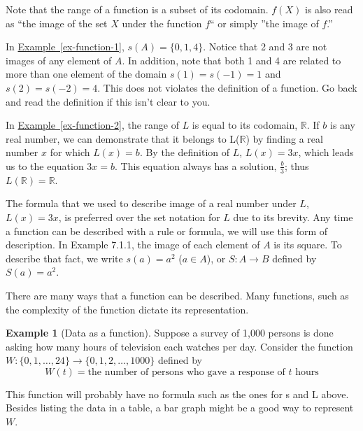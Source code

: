 \documentclass[10pt,]{book}
\theoremstyle{plain}
\theoremstyle{definition}
\theoremstyle{definition}
\newtheorem{example}[theorem]{Example}
\theoremstyle{definition}
\begin{document}
\par
Note that the range of a function is a subset of its codomain. \(f(X)\) is also read as ``the image of the set \(X\) under the function \(f\)`` or simply ''the image of \(f\).''%
\par
In \hyperref[ex-function-1]{Example~\ref{ex-function-1}}, \(s(A)= \{0, 1, 4\}\). Notice that 2 and 3 are not images of any element of \(A\). In addition, note that both 1 and 4 are related to more than one element of the domain \(s(1) = s(-1) = 1\) and \(s(2) = s(-2) = 4\). This does not violates the definition of a function. Go back and read the definition if this isn't clear to you.%
\par
In \hyperref[ex-function-2]{Example~\ref{ex-function-2}}, the range of \(L\) is equal to its codomain, \(\mathbb{R}\). If \(b\) is any real number, we can demonstrate that it
belongs to L(\(\mathbb{R}\)) by finding a real number \(x\) for which \(L(x) = b\). By the definition of \(L\), \(L(x) = 3x\), which leads
us to the equation \(3x = b\). This equation always has a solution, \(\frac{b}{3}\); thus \(L(\mathbb{R}) = \mathbb{R}\).%
\par
The formula that we used to describe image of a real number under \(L\), \(L(x) = 3x\), is preferred over the set notation for \(L\)
due to its brevity. Any time a function can be described with a rule or formula, we will use this form of description. In Example 7.1.1, the image
of each element of \(A\) is its square. To describe that fact, we write \(s(a) = a^2\) (\(a \in  A\)), or \(S:A \rightarrow  B\) defined by
\(S(a) = a^2\).%
\par
There are many ways that a function can be described. Many functions, such as the complexity of the function dictate its representation.%
\begin{example}[Data as a function]\label{ex-data-function}
Suppose a survey of 1,000 persons is done asking how many hours of television each watches per day. Consider the function \(W:
\{0,1,\ldots , 24\} \rightarrow  \{0,1,2,\ldots ,1000\}\) defined by 
 \[W(t) = \textrm{the number of persons who gave a response of } t \textrm{ hours}\] 

This function will probably have no formula such as the ones for s and L above. Besides listing the data in a table, a bar graph might be a good
way to represent \(W\).%
\end{example}
\end{document}
